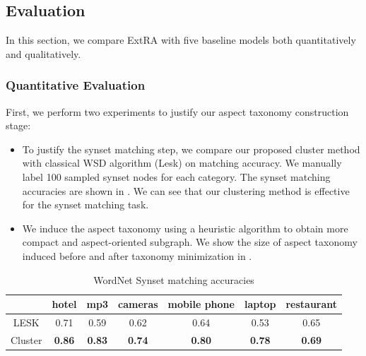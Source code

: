 \subsection{Evaluation}
\label{sec:endeval}
In this section, we compare ExtRA with five baseline models 
both quantitatively and qualitatively.


\subsubsection{Quantitative Evaluation}
\label{sec:quaneval}
First, we perform two experiments to justify our aspect taxonomy construction stage:
\begin{itemize}
	\item 
	To justify the synset matching step,
	we compare our proposed cluster method with classical WSD algorithm (Lesk) on matching accuracy.
	We manually label 100 sampled synset nodes for each category.
	The synset matching accuracies are shown in 
	.
	We can see that our clustering method is effective 
	for the synset matching task.
	\item 
	We induce the aspect taxonomy using a heuristic algorithm to obtain
	more compact and aspect-oriented subgraph. 
	We show the size of aspect taxonomy induced before and after 
taxonomy minimization in .
\end{itemize}

\begin{table}[th]
	\scriptsize
	\centering
	\vspace{-0.3cm}
	\caption{WordNet Synset matching accuracies}
	\label{synsetmatching}
	\begin{tabular}{|c|c|c|c|c|c|c|}
		\hline
		& hotel & mp3  & cameras & mobile phone & laptop & restaurant \\ \hline \hline
		LESK    & 0.71  & 0.59 & 0.62    & 0.64                                                   & 0.53   & 0.65       \\ \hline
		Cluster & \textbf{0.86}  & \textbf{0.83} & \textbf{0.74}    & \textbf{0.80}                                                   & \textbf{0.78}   & \textbf{0.69}       \\ \hline
	\end{tabular}
	\vspace{-0.2cm}
\end{table}

